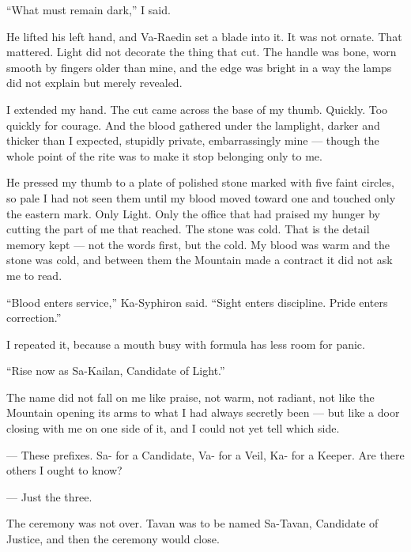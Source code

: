 ``What must remain dark,'' I said.\par

He lifted his left hand, and Va-Raedin set a blade into it. 
It was not ornate. 
That mattered. 
Light did not decorate the thing that cut. 
The handle was bone, worn smooth by fingers older than mine, and the edge was bright in a way the lamps did not explain but merely revealed.\par

I extended my hand. 
The cut came across the base of my thumb. 
Quickly. 
Too quickly for courage. 
And the blood gathered under the lamplight, darker and thicker than I expected, stupidly private, embarrassingly mine --- though the whole point of the rite was to make it 
stop belonging only to me.\par

He pressed my thumb to a plate of polished stone marked with five faint circles, so pale I had not seen them until my blood moved toward one and touched only the eastern mark. 
Only Light. 
Only the office that had praised my hunger by cutting the part of me that reached. 
The stone was cold. 
That is the detail memory kept --- not the words first, but the cold. 
My blood was warm and the stone was cold, and between them the Mountain made a contract it did not ask me to read.\par

``Blood enters service,'' Ka-Syphiron said. ``Sight enters discipline. Pride enters correction.''\par

I repeated it, because a mouth busy with formula has less room for panic.\par

``Rise now as Sa-Kailan, Candidate of Light.''\par

The name did not fall on me like praise, not warm, not radiant, not like the Mountain opening its arms to what I had always secretly been --- but like a door closing with me on 
one side of it, and I could not yet tell which side. 

\begin{room}

--- These prefixes. Sa- for a Candidate, Va- for a Veil, Ka- for a Keeper. Are there others I ought to know?

--- Just the three.

\end{room}

The ceremony was not over. Tavan was to be named Sa-Tavan, Candidate of Justice, and then the ceremony would close.

